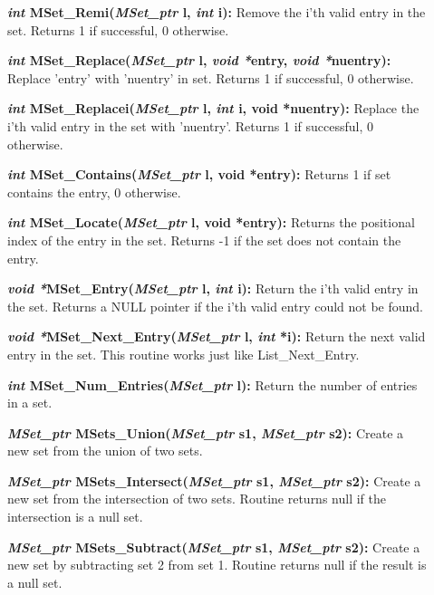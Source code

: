 \documentclass[12pt]{article}
\begin{document}
\begin{description}
\item[]{\bf {\em int} MSet\_Remi({\em MSet\_ptr} l, {\em int} i):}
  Remove the i'th valid entry in the set. Returns 1 if successful, 0
  otherwise.

\item[]{\bf {\em int} MSet\_Replace({\em MSet\_ptr} l, {\em void
      *}entry, {\em void *}nuentry):} Replace 'entry' with 'nuentry'
  in set. Returns 1 if successful, 0 otherwise.

\item[]{\bf {\em int} MSet\_Replacei({\em MSet\_ptr} l, {\em int} i,
    void *nuentry):} Replace the i'th valid entry in the set with
  'nuentry'. Returns 1 if successful, 0 otherwise.

\item[]{\bf {\em int} MSet\_Contains({\em MSet\_ptr} l, void *entry):}
  Returns 1 if set contains the entry, 0 otherwise.

\item[]{\bf {\em int} MSet\_Locate({\em MSet\_ptr} l, void *entry):}
  Returns the positional index of the entry in the set. Returns -1 if
  the set does not contain the entry.

\item[]{\bf {\em void *}MSet\_Entry({\em MSet\_ptr} l, {\em int} i):}
  Return the i'th valid entry in the set.  Returns a NULL pointer if
  the i'th valid entry could not be found.

\item[]{\bf {\em void *}MSet\_Next\_Entry({\em MSet\_ptr} l, {\em int}
    *i):} Return the next valid entry in the set. This routine works
  just like List\_Next\_Entry.

\item[]{\bf {\em int} MSet\_Num\_Entries({\em MSet\_ptr} l):} Return
  the number of entries in a set.

\item[]{\bf {\em MSet\_ptr} MSets\_Union({\em MSet\_ptr} s1, {\em
      MSet\_ptr} s2):} Create a new set from the union of two sets.

\item[]{\bf {\em MSet\_ptr} MSets\_Intersect({\em MSet\_ptr} s1, {\em
      MSet\_ptr} s2):} Create a new set from the intersection of two
  sets. Routine returns null if the intersection is a null set.

\item[]{\bf {\em MSet\_ptr} MSets\_Subtract({\em MSet\_ptr} s1, {\em
      MSet\_ptr} s2):} Create a new set by subtracting set 2 from set
  1. Routine returns null if the result is a null set.

\end{description}
\end{document}

